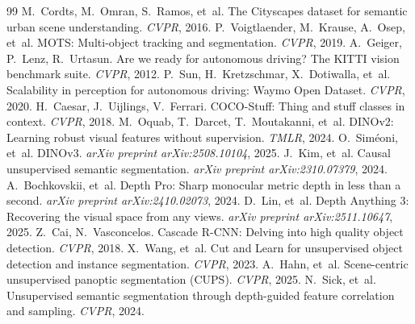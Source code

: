\documentclass{article}
\begin{document}
\begin{thebibliography}{99}
 M.~Cordts, M.~Omran, S.~Ramos, et~al. The Cityscapes dataset for semantic urban scene understanding. \emph{CVPR}, 2016.
 P.~Voigtlaender, M.~Krause, A.~Osep, et~al. MOTS: Multi-object tracking and segmentation. \emph{CVPR}, 2019.
 A.~Geiger, P.~Lenz, R.~Urtasun. Are we ready for autonomous driving? The KITTI vision benchmark suite. \emph{CVPR}, 2012.
 P.~Sun, H.~Kretzschmar, X.~Dotiwalla, et~al. Scalability in perception for autonomous driving: Waymo Open Dataset. \emph{CVPR}, 2020.
 H.~Caesar, J.~Uijlings, V.~Ferrari. COCO-Stuff: Thing and stuff classes in context. \emph{CVPR}, 2018.
 M.~Oquab, T.~Darcet, T.~Moutakanni, et~al. DINOv2: Learning robust visual features without supervision. \emph{TMLR}, 2024.
 O.~Sim\'eoni, et~al. DINOv3. \emph{arXiv preprint arXiv:2508.10104}, 2025.
 J.~Kim, et~al. Causal unsupervised semantic segmentation. \emph{arXiv preprint arXiv:2310.07379}, 2024.
 A.~Bochkovskii, et~al. Depth Pro: Sharp monocular metric depth in less than a second. \emph{arXiv preprint arXiv:2410.02073}, 2024.
 D.~Lin, et~al. Depth Anything 3: Recovering the visual space from any views. \emph{arXiv preprint arXiv:2511.10647}, 2025.
 Z.~Cai, N.~Vasconcelos. Cascade R-CNN: Delving into high quality object detection. \emph{CVPR}, 2018.
 X.~Wang, et~al. Cut and Learn for unsupervised object detection and instance segmentation. \emph{CVPR}, 2023.
 A.~Hahn, et~al. Scene-centric unsupervised panoptic segmentation (CUPS). \emph{CVPR}, 2025.
 N.~Sick, et~al. Unsupervised semantic segmentation through depth-guided feature correlation and sampling. \emph{CVPR}, 2024.
\end{thebibliography}
\end{document}
